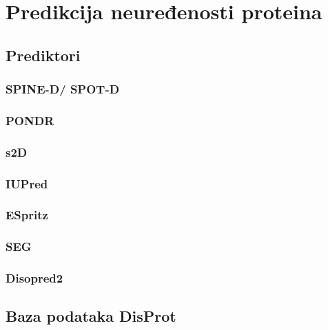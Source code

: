 
\chapter{Predikcija neuređenosti proteina} %

\label{predikcija} %


\section{Prediktori}

\subsection{SPINE-D/ SPOT-D}



\subsection{PONDR}

\subsection{s2D}
\subsection{IUPred}
\subsection{ESpritz}
\subsection{SEG}
\subsection{Disopred2}


\section{Baza podataka DisProt}
